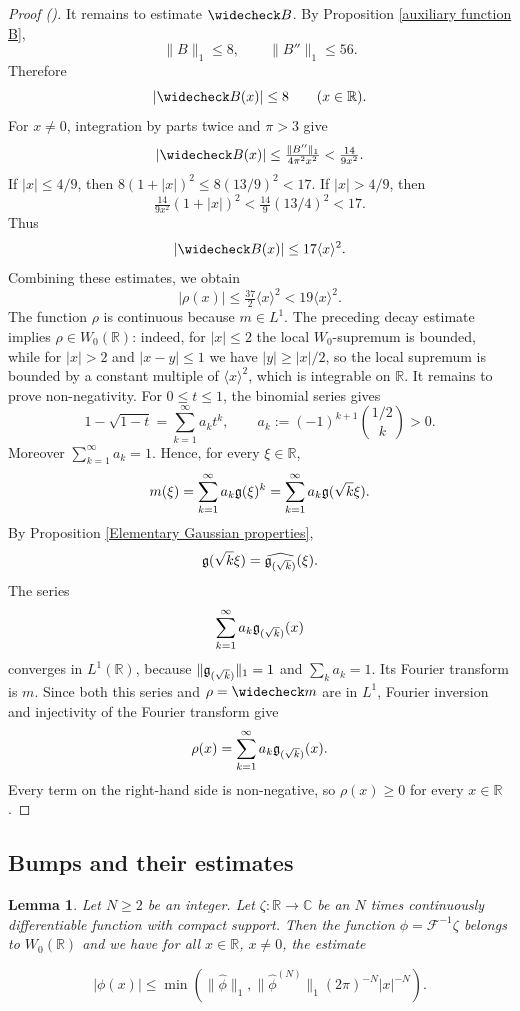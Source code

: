 \documentclass[12pt,reqno]{amsart}
\newcommand{\auto}{{({\tiny\faCar})}}
\theoremstyle{plain}
\newtheorem{lemma}[theorem]{Lemma}
\numberwithin{equation}{section}
\theoremstyle{remark}
\newcommand{\R}{{\mathbb R}}
\newcommand{\C}{{\mathbb C}}
\begin{document}
\begin{proof}[Proof \auto]
It remains to estimate \(\widecheck B\). By Proposition \ref{auxiliary function B},
\[
    \|B\|_1\le 8,
    \qquad
    \|B''\|_1\le 56.
\]
Therefore
\[
    |\widecheck B(x)|\le 8
    \qquad (x\in\R).
\]
For \(x\neq 0\), integration by parts twice and $\pi>3$ give
\[
    |\widecheck B(x)|
    \le
    \tfrac{\|B''\|_1}{4\pi^2x^2}
    <
    \tfrac{14}{9x^2}.
\]
If $|x|\le4/9$, then
$8(1+|x|)^2\le8(13/9)^2<17$.
If $|x|>4/9$, then
\[
\tfrac{14}{9x^2}(1+|x|)^2
<\tfrac{14}{9}(13/4)^2<17.
\]
Thus
\begin{equation}\label{eq:Bcheck-decay}
|\widecheck B(x)|\le17\langle x\rangle^2.
\end{equation}
Combining these estimates, we obtain
\[
|\rho(x)|\le\tfrac{37}{2}\langle x\rangle^2
<19\langle x\rangle^2.
\]
The function \(\rho\) is continuous because \(m\in L^1\). The preceding decay estimate implies
\(\rho\in W_0(\R)\): indeed, for \(|x|\le 2\) the local \(W_0\)-supremum is bounded, while for
\(|x|>2\) and \(|x-y|\le 1\) we have \(|y|\ge |x|/2\), so the local supremum is bounded by a
constant multiple of \(\langle x\rangle^{2}\), which is integrable on \(\R\).
It remains to prove non-negativity. For \(0\le t\le 1\), the binomial series gives
\[
    1-\sqrt{1-t}
    =
    \sum_{k=1}^\infty a_k t^k,
    \qquad
    a_k:=(-1)^{k+1}\binom{1/2}{k}>0.
\]
Moreover \(\sum_{k=1}^\infty a_k=1\). Hence, for every \(\xi\in\R\),
\[
    m(\xi)
    =
    \sum_{k=1}^\infty a_k \mathfrak{g}(\xi)^k
    =
    \sum_{k=1}^\infty a_k \mathfrak{g}(\sqrt{k}\xi).
\]
By Proposition \ref{Elementary Gaussian properties},
\[
    \mathfrak{g}(\sqrt{k}\xi)=\widehat{\mathfrak{g}_{(\sqrt{k})}}(\xi).
\]
The series
\[
\sum_{k=1}^\infty a_k\mathfrak{g}_{(\sqrt{k})}(x)
\]
converges in $L^1(\R)$, because $\|\mathfrak{g}_{(\sqrt{k})}\|_1=1$ and $\sum_ka_k=1$. Its Fourier transform is $m$. Since both this series and $\rho=\widecheck m$ are in $L^1$, Fourier inversion and injectivity of the Fourier transform give
\[
    \rho(x)
    =
    \sum_{k=1}^\infty a_k \mathfrak{g}_{(\sqrt{k})}(x).
\]
Every term on the right-hand side is non-negative, so \(\rho(x)\ge 0\) for every \(x\in\R\).
\end{proof}

\subsection{Bumps and their estimates}\label{bump section}


\begin{lemma}
\label{lem:smoothdecay}
Let $N\geq 2$ be an integer. Let $\zeta:\R\to\C$ be an $N$ times continuously differentiable function with compact support. Then the function $\phi=\mathcal F^{-1}\zeta$ belongs to $W_0(\R)$ and we have for all $x\in\R$, $x\neq0$, the estimate


\begin{equation}\label{auto:Fourier-decay-minimum-bound}|\phi(x)|\le \min(\|\widehat{\phi}\|_1, \|\widehat{\phi}^{(N)}\|_1 (2\pi)^{-N} |x|^{-N}).\end{equation}
\end{lemma}
\end{document}
